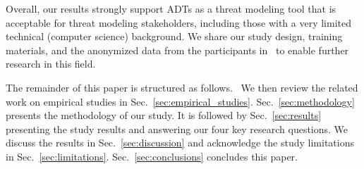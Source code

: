 Overall, our results strongly support ADTs as a threat modeling tool that is acceptable for threat modeling stakeholders, including those with a very limited technical (computer science) background. We share our study design, training materials, and the anonymized data from the participants in~\cite{zenodo-dataset} to enable further research in this field. 

The remainder of this paper is structured as follows. \ We then review the related work on empirical studies in Sec.~\ref{sec:empirical_studies}. Sec.~\ref{sec:methodology} presents the methodology of our study. It is followed by Sec.~\ref{sec:results} presenting the study results and answering our four key research questions. We discuss the results in Sec.~\ref{sec:discussion} and acknowledge the study limitations in Sec.~\ref{sec:limitations}. Sec.~\ref{sec:conclusions} concludes this paper. 




